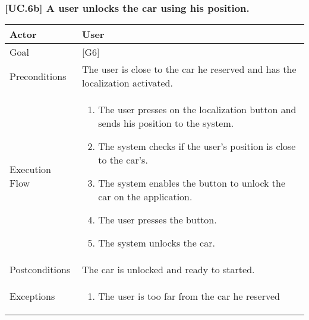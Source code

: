 \documentclass[english]{article}
\begin{document}
	\subsubsection{[UC.6b] A user unlocks the car using his position.}
	\begin{tabularx}{\textwidth}{  l  X  }
		\hline
		Actor & User\\
		\hline
		Goal & [G6]\\
		\hline
		Preconditions & The user is close to the car he reserved and has the localization activated.\\
		\hline
		Execution Flow & \begin{enumerate}
			\item{The user presses on the localization button and sends his position to the system.}
			\item{The system checks if the user's position is close to the car's.}
			\item{The system enables the button to unlock the car on the application.}
			\item{The user presses the button.}
			\item{The system unlocks the car.}
		\end{enumerate}\\
		\hline
		Postconditions & The car is unlocked and ready to started.\\
		\hline
		Exceptions & \begin{enumerate}
			\item{The user is too far from the car he reserved}
		\end{enumerate}\\
		\hline
	\end{tabularx}
	
\end{document}
